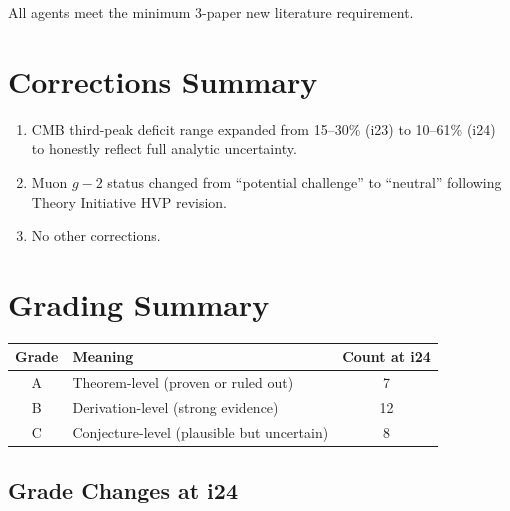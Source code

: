 \documentclass[11pt]{article}
\begin{document}
All agents meet the minimum 3-paper new literature requirement.

\section{Corrections Summary}

\begin{tcolorbox}[colback=yellow!5!white, colframe=yellow!70!black,
  title=\textbf{ALL CORRECTIONS FROM i24}]

\begin{enumerate}
  \item CMB third-peak deficit range expanded from 15--30\% (i23) to
    10--61\% (i24) to honestly reflect full analytic uncertainty.
  \item Muon $g-2$ status changed from ``potential challenge'' to
    ``neutral'' following Theory Initiative HVP revision.
  \item No other corrections.
\end{enumerate}

\end{tcolorbox}

\section{Grading Summary}

\begin{center}
\begin{tabular}{clc}
\toprule
\textbf{Grade} & \textbf{Meaning} & \textbf{Count at i24} \\
\midrule
A & Theorem-level (proven or ruled out) & 7 \\
B & Derivation-level (strong evidence) & 12 \\
C & Conjecture-level (plausible but uncertain) & 8 \\
\bottomrule
\end{tabular}
\end{center}

\subsection{Grade Changes at i24}
\end{document}
